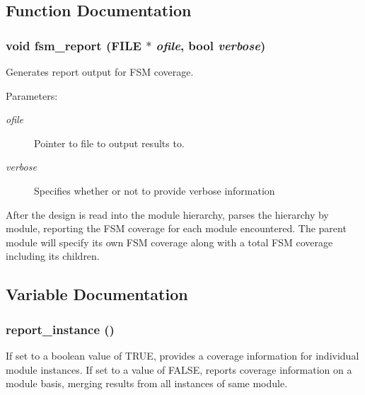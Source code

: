 \subsection{Function Documentation}
\subsubsection{\setlength{\rightskip}{0pt plus 5cm}void fsm\_\-report (FILE $\ast$ {\em ofile}, {\bf bool} {\em verbose})}\label{fsm_8c_a1}


Generates report output for FSM coverage.

\begin{Desc}
\item[Parameters:]
\begin{description}
\item[{\em ofile}]Pointer to file to output results to. \item[{\em verbose}]Specifies whether or not to provide verbose information\end{description}
\end{Desc}
After the design is read into the module hierarchy, parses the hierarchy by module, reporting the FSM coverage for each module encountered. The parent module will specify its own FSM coverage along with a total FSM coverage including its children. 

\subsection{Variable Documentation}
\subsubsection{ report\_\-instance ()}\label{fsm_8c_a0}


If set to a boolean value of TRUE, provides a coverage information for individual module instances. If set to a value of FALSE, reports coverage information on a module basis, merging results from all instances of same module. 